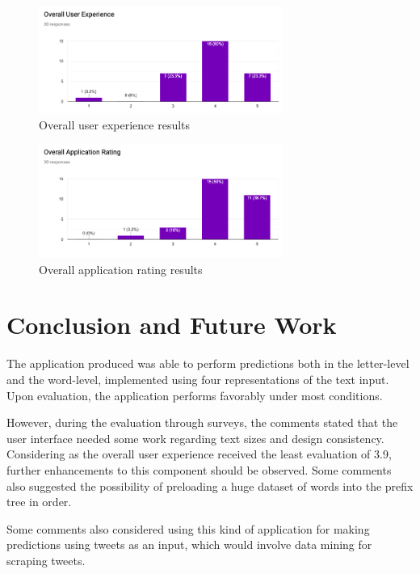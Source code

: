 \documentclass[journal]{./IEEE/IEEEtran}
\begin{document}
\begin{figure}[!ht]
\begin{center}

\includegraphics[width=80mm]{images/q5.png}
\caption{Overall user experience results}

\end{center}
\end{figure}

\begin{figure}[!ht]
\begin{center}

\includegraphics[width=80mm]{images/q6.png}
\caption{Overall application rating results}

\end{center}
\end{figure}

\section{Conclusion and Future Work}
The application produced was able to perform predictions both in the letter-level and the word-level, implemented using four representations of the text input. Upon evaluation, the application performs favorably under most conditions.

However, during the evaluation through surveys, the comments stated that the user interface needed some work regarding text sizes and design consistency. Considering as the overall user experience received the least evaluation of 3.9, further enhancements to this component should be observed. Some comments also suggested the possibility of preloading a huge dataset of words into the prefix tree in order.

Some comments also considered using this kind of application for making predictions using tweets as an input, which would involve data mining for scraping tweets.
\end{document}

